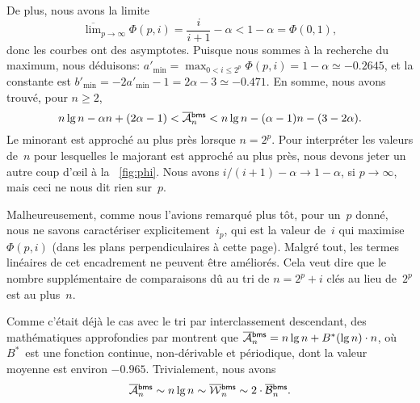 De plus, nous avons la limite
\begin{equation*}
  \overline\lim_{p \to \infty}\Phi(p,i) = \frac{i}{i+1} - \alpha <
  1 - \alpha = \Phi(0,1),
\end{equation*}
donc les courbes ont des asymptotes. Puisque nous sommes à la
recherche du maximum, nous déduisons: \(a'_{\min} = \max_{0 < i
  \leqslant 2^p}\Phi(p,i) = 1 - \alpha \simeq -0.2645\), et la
constante est \(b'_{\min} = -2a'_{\min} - 1 = 2\alpha - 3 \simeq
-0.471\). En somme, nous avons trouvé, pour \(n \geqslant 2\),
\begin{equation}
n\lg n - \alpha n + (2\alpha - 1) < \OM{\fun{bms}}{n}
< n\lg n - (\alpha - 1)n - (3 - 2\alpha).
\label{ineq:bounds_Mbms}
\end{equation}
Le minorant est approché au plus près lorsque \(n=2^p\). Pour
interpréter les valeurs de~\(n\) pour lesquelles le majorant est
approché au plus près, nous devons jeter un autre coup d'{\oe}il à la
\fig~\vref{fig:phi}. Nous avons \(i/(i+1) - \alpha \to 1 - \alpha\),
si \(p \to \infty\), mais ceci ne nous dit rien
sur~\(p\).

Malheureusement, comme nous l'avions remarqué plus tôt, pour un~\(p\)
donné, nous ne savons caractériser explicitement~\(i_p\), qui est la
valeur de~\(i\) qui maximise \(\Phi(p,i)\) (dans les plans
perpendiculaires à cette page). Malgré tout, les termes linéaires de
cet encadrement ne peuvent être améliorés. Cela veut dire que le
nombre supplémentaire de comparaisons dû au tri de \(n=2^p+i\) clés au
lieu de~\(2^p\) est au plus~\(n\).

Comme c'était déjà le cas avec le tri par interclassement descendant,
des mathématiques approfondies par \cite{PannyProdinger_1995} montrent
que \(\OM{\fun{bms}}{n} = n\lg n + B^*(\lg n) \cdot
n\), où \(B^*\)~est une fonction
continue, non-dérivable et périodique, dont la valeur moyenne est
environ \(-0.965\). Trivialement, nous avons
\begin{equation*}
\OM{\fun{bms}}{n} \sim n\lg n \sim \OW{\fun{bms}}{n} \sim 2 \cdot
\OB{\fun{bms}}{n}.
\end{equation*}


